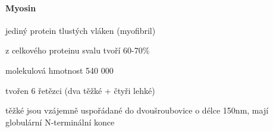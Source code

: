 \documentclass[DIV=8]{scrreprt}
\begin{document}

\paragraph{Myosin}
\begin{myItemize}[nosep]
    \item jediný protein tlustých vláken (myofibril)
    \item z celkového proteinu svalu tvoří 60-70\%
    \item molekulová hmotnost 540 000
    \item tvořen 6 řetězci (dva těžké + čtyři lehké)
\begin{myItemize}[nosep]
    \item těžké jsou vzájemně uspořádané do dvoušroubovice o délce 150nm, mají globulární N-terminální konce
\end{myItemize}

\end{myItemize}
\end{document}
